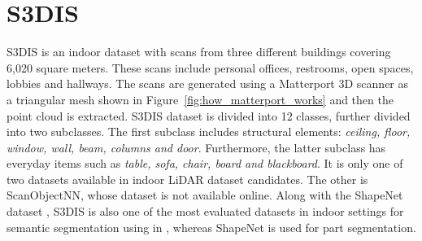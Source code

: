 \section{S3DIS}
\label{sec:dataset_s3dis}
S3DIS is an indoor dataset with scans from three different buildings covering 6,020 square meters.
These scans include personal offices, restrooms, open spaces, lobbies and hallways.
The scans are generated using a Matterport 3D scanner as a triangular mesh shown in Figure~\ref{fig:how_matterport_works} and then the point cloud is extracted.
S3DIS dataset is divided into 12 classes, further divided into two subclasses.
The first subclass includes structural elements: \textit{ceiling, floor, window, wall, beam, columns and door}.
Furthermore, the latter subclass has everyday items such as \textit{table, sofa, chair, board and blackboard}.
It is only one of two datasets available in indoor LiDAR dataset candidates. 
The other is ScanObjectNN, whose dataset is not available online.
Along with the ShapeNet dataset \cite{chang2015shapenet}, S3DIS is also one of the most evaluated datasets in indoor settings for semantic segmentation using in \cite{Armeni_2016_CVPR_S3DIS}, whereas ShapeNet is used for part segmentation.
